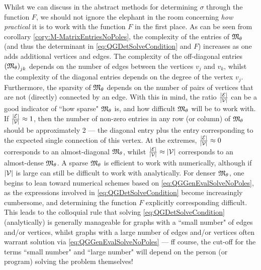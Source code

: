 Whilst we can discuss in the abstract methods for determining $\sigma$ through the function $F$, we should not ignore the elephant in the room concerning \emph{how practical} it is to work with the function $F$ in the first place.
As can be seen from corollary \ref{cory:M-MatrixEntriesNoPoles}, the complexity of the entries of $\mathfrak{M}_{\theta}$ (and thus the determinant in \eqref{eq:QGDetSolveCondition} and $F$) increases as one adds additional vertices and edges.
The complexity of the off-diagonal entries $\left( \mathfrak{M}_\theta \right)_{jk}$ depends on the number of edges between the vertices $v_j$ and $v_k$, whilst the complexity of the diagonal entries depends on the degree of the vertex $v_j$.
Furthermore, the sparsity of $\mathfrak{M}_\theta$ depends on the number of pairs of vertices that are not (directly) connected by an edge.
With this in mind, the ratio $\frac{\left\lvert \mathcal{E} \right\rvert}{\left\lvert \mathcal{V} \right\rvert}$ can be a good indicator of ``how sparse" $\mathfrak{M}_\theta$ is, and how difficult $\mathfrak{M}_\theta$ will be to work with.
If $\frac{\left\lvert \mathcal{E} \right\rvert}{\left\lvert \mathcal{V} \right\rvert}\approx 1$, then the number of non-zero entries in any row (or column) of $\mathfrak{M}_\theta$ should be approximately 2 --- the diagonal entry plus the entry corresponding to the expected single connection of this vertex.
At the extremes, $\frac{\left\lvert \mathcal{E} \right\rvert}{\left\lvert \mathcal{V} \right\rvert}\approx 0$ corresponds to an almost-diagonal $\mathfrak{M}_\theta$, whilst $\frac{\left\lvert \mathcal{E} \right\rvert}{\left\lvert \mathcal{V} \right\rvert}\approx \left\lvert \mathcal{V} \right\rvert$ corresponds to an almost-dense $\mathfrak{M}_\theta$.
A sparse $\mathfrak{M}_\theta$ is efficient to work with numerically, although if $\left\lvert \mathcal{V} \right\rvert$ is large can still be difficult to work with analytically.
For denser $\mathfrak{M}_\theta$, one begins to lean toward numerical schemes based on \eqref{eq:QGGenEvalSolveNoPoles}, as the expressions involved in \eqref{eq:QGDetSolveCondition} become increasingly cumbersome, and determining the function $F$ explicitly corresponding difficult.
This leads to the colloquial rule that solving \eqref{eq:QGDetSolveCondition} (analytically) is generally manageable for graphs with a ``small number" of edges and/or vertices, whilst graphs with a large number of edges and/or vertices often warrant solution via \eqref{eq:QGGenEvalSolveNoPoles} --- ff course, the cut-off for the terms ``small number" and ``large number" will depend on the person (or program) solving the problem themselves!

